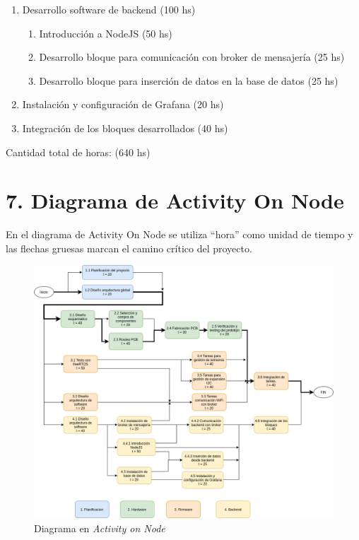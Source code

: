 \documentclass[11pt]{charter}
\begin{document}
\begin{enumerate}
\begin{enumerate}
	\item Desarrollo software de backend (100 hs)
		\begin{enumerate}
		\item Introducción a NodeJS (50 hs)
		\item Desarrollo bloque para comunicación con broker de mensajería (25 hs)
		\item Desarrollo bloque para inserción de datos en la base de datos (25 hs)
		\end{enumerate}
	\item Instalación y configuración de Grafana (20 hs)
	\item Integración de los bloques desarrollados (40 hs)
	\end{enumerate}
\end{enumerate}


Cantidad total de horas: (640 hs)

\clearpage

\section{7. Diagrama de Activity On Node}
\label{sec:AoN}

En el diagrama de Activity On Node se utiliza ``hora'' como unidad de tiempo y las flechas gruesas marcan el camino crítico del proyecto.




\begin{figure}[htpb]
\centering 
\includegraphics[width=\textwidth]{./Figuras/AoN.png}
\caption{Diagrama en \textit{Activity on Node}}
\label{fig:AoN}
\end{figure}
\end{document}
